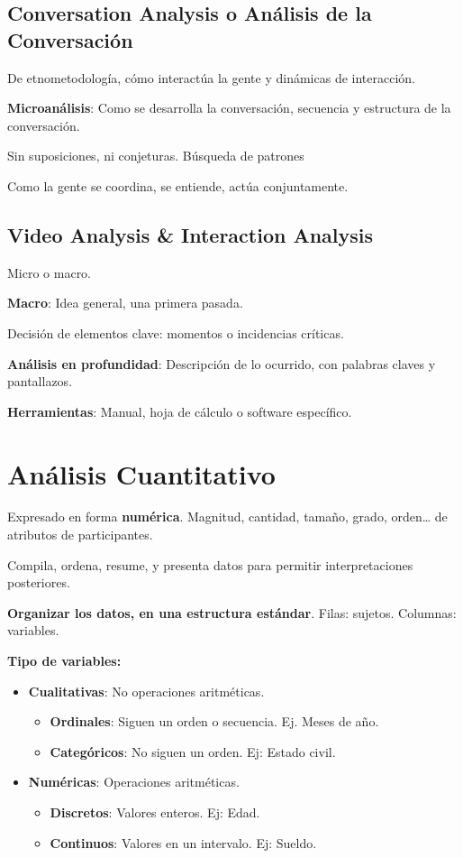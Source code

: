 \documentclass[12pt, twoside, openright]{report} %
\begin{document}
\subsection{Conversation Analysis o Análisis de la
	Conversación}

De etnometodología, cómo interactúa la gente y dinámicas de interacción.

\textbf{Microanálisis}: Como se desarrolla la conversación, secuencia y
estructura de la conversación.

Sin suposiciones, ni conjeturas. Búsqueda de patrones

Como la gente se coordina, se entiende, actúa conjuntamente.

\subsection{Video Analysis \& Interaction
	Analysis}

Micro o macro.

\textbf{Macro}: Idea general, una primera pasada.

Decisión de elementos clave: momentos o incidencias críticas.

\textbf{Análisis en profundidad}: Descripción de lo ocurrido, con
palabras claves y pantallazos.

\textbf{Herramientas}: Manual, hoja de cálculo o software específico.

\section{Análisis Cuantitativo}

Expresado en forma \textbf{numérica}. Magnitud, cantidad, tamaño, grado,
orden\ldots{} de atributos de participantes.

Compila, ordena, resume, y presenta datos para permitir interpretaciones
posteriores.

\textbf{Organizar los datos, en una estructura estándar}. Filas: sujetos. Columnas: variables.

\textbf{Tipo de variables:}

\begin{itemize}
	\item \textbf{Cualitativas}: No operaciones aritméticas.

	      \begin{itemize}
		      \item \textbf{Ordinales}: Siguen un orden o secuencia. Ej. Meses de año.
		      \item \textbf{Categóricos}: No siguen un orden. Ej: Estado civil.
	      \end{itemize}
		  \pagebreak

	\item \textbf{Numéricas}: Operaciones aritméticas.

	      \begin{itemize}
		      \item \textbf{Discretos}: Valores enteros. Ej: Edad.
		      \item \textbf{Continuos}: Valores en un intervalo. Ej: Sueldo.
	      \end{itemize}
\end{itemize}
\end{document}
